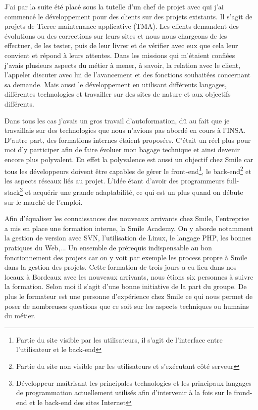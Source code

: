 \documentclass[a4paper,11pt,twoside]{report}
\begin{document}
  J'ai par la suite été placé sous la tutelle d'un chef de projet avec qui j'ai commencé le développement pour des clients sur des projets existants. Il s'agit de projets de Tierce maintenance applicative (TMA). Les clients demandent des évolutions ou des corrections sur leurs sites et nous nous chargeons de les effectuer, de les tester, puis de leur livrer et de vérifier avec eux que cela leur convient et répond à leurs attentes. Dans les missions qui m'étaient confiées j'avais plusieurs aspects du métier à mener, à savoir, la relation avec le client, l'appeler discuter avec lui de l'avancement et des fonctions souhaitées concernant sa demande. Mais aussi le développement en utilisant différents langages, différentes technologies et travailler sur des sites de nature et aux objectifs différents.\newline 
  
  Dans tous les cas j'avais un gros travail d'autoformation, dû au fait que je travaillais sur des technologies que nous n'avions pas abordé en cours à l'INSA. D'autre part, des formations internes étaient proposées. C'était un réel plus pour moi d'y participer afin de faire évoluer mon bagage technique et ainsi devenir encore plus polyvalent. En effet la polyvalence est aussi un objectif chez Smile car tous les développeurs doivent être capables de gérer le front-end\footnote{Partie du site visible par les utilisateurs, il s'agit de l'interface entre l'utilisateur et le back-end}, le back-end\footnote{Partie du site non visible par les utilisateurs et s'exécutant côté serveur} et les aspects réseaux liés au projet. L'idée étant d'avoir des programmeurs full-stack\footnote{Développeur maîtrisant les principales technologies et les principaux langages de programmation actuellement utilisés afin d'intervenir à la fois sur le frond-end et le back-end des sites Internet} et acquérir une grande adaptabilité, ce qui est un plus quand on débute sur le marché de l'emploi.\newline
  
  Afin d'équaliser les connaissances des nouveaux arrivants chez Smile, l'entreprise a mis en place une formation interne, la Smile Academy. On y aborde notamment la gestion de version avec SVN, l'utilisation de Linux, le langage PHP, les bonnes pratiques du Web,... Un ensemble de prérequis indispensable au bon fonctionnement des projets car on y voit par exemple les process propre à Smile dans la gestion des projets. Cette formation de trois jours a eu lieu dans nos locaux à Bordeaux avec les nouveaux arrivants, nous étions six personnes à suivre la formation. Selon moi il s'agit d'une bonne initiative de la part du groupe. De plus le formateur est une personne d'expérience chez Smile ce qui nous permet de poser de nombreuses questions que ce soit sur les aspects techniques ou humains du métier.\newline
  
\end{document}
